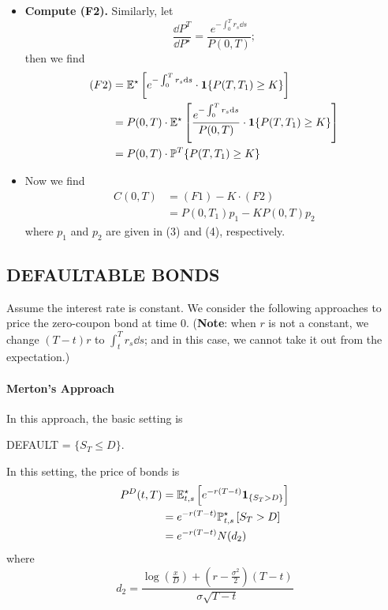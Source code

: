 \begin{example}
\begin{itemize}
			\item \textbf{Compute (F2).} Similarly, let $$\frac{ \dd P^T }{ \dd P^\star } = \frac{e^{ -\int^T_0 r_s \dd s }}{P(0,T)};$$
			then we find
			\begin{align*}
			(F2) &= \mathbb{E}^\star \left[  e^{ -\int^T_0 r_s \mathrm{d} s } \cdot \boldsymbol{1}\{ P(T,T_1) \geq K \} \right] \\
			&= P(0,T)\cdot \mathbb{E}^\star \left[  \frac{e^{ -\int^T_0 r_s \mathrm{d} s }}{P(0,T)} \cdot \boldsymbol{1}\{ P(T,T_1) \geq K \} \right] \\
			&= P(0,T) \cdot \mathbb{P}^T \{ P(T,T_1) \geq K \}  
			\end{align*}
			
			\item Now we find
			\begin{align*}
			C(0,T) &= (F1) - K \cdot (F2) \\
			&= P(0,T_1) p_1 - KP(0,T) p_2
			\end{align*}
			where $p_1$ and $p_2$ are given in (3) and (4), respectively. 
		\end{itemize}
			   
\end{example}

\subsection*{DEFAULTABLE BONDS} 
Assume the interest rate is constant. We consider the following approaches to price the zero-coupon bond at time $0$. (\textbf{Note}: when $r$ is not a constant, we change $(T-t)r$ to $\int^T_t r_s \dd s$; and in this case, we cannot take it out from the expectation.)
\paragraph{Merton’s Approach} In this approach, the basic setting is 
\begin{center}
	DEFAULT = $\{ S_T \leq D \}$.
\end{center}
In this setting, the price of bonds is
\begin{align*}
	P^D(t,T) &= \mathbb{E}^\star_{t,s} \left[ e^{-r(T-t)} \boldsymbol{1}_{\{ S_T > D \}} \right] \\
	&= e^{-r(T-t)} \mathbb{P}^\star_{t,s}\left[ S_T > D \right]\\
	&= e^{-r(T-t)} N(d_2)
\end{align*}
where 
$$d_2 = \frac{ \log(\frac{x}{D}) + (r - \frac{\sigma^2}{2})(T-t) }{\sigma\sqrt{T-t}}$$

